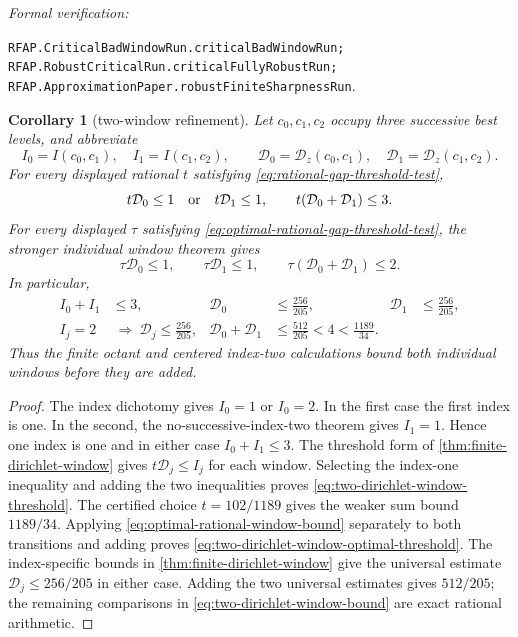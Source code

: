 \documentclass[11pt]{article}
\newtheorem{corollary}[corollary]{Corollary}
\newcommand{\leanref}[1]{\par\smallskip\noindent
  \emph{Formal verification:}\par\nobreak
  {\raggedright\nolinkurl{#1}.\par}}
\begin{document}
\leanref{RFAP.CriticalBadWindowRun.criticalBadWindowRun;
RFAP.RobustCriticalRun.criticalFullyRobustRun;
RFAP.ApproximationPaper.robustFiniteSharpnessRun}

\begin{corollary}[two-window refinement]
\label{cor:two-dirichlet-windows}
Let $c_0,c_1,c_2$ occupy three successive best levels, and abbreviate
\[
 I_0=I(c_0,c_1),\quad I_1=I(c_1,c_2),\qquad
 \mathcal D_0=\mathcal D_z(c_0,c_1),\quad
 \mathcal D_1=\mathcal D_z(c_1,c_2).
\]
For every displayed rational $t$ satisfying
\eqref{eq:rational-gap-threshold-test},
\begin{equation}
\label{eq:two-dirichlet-window-threshold}
 t\mathcal D_0\le1\quad\hbox{or}\quad t\mathcal D_1\le1,
 \qquad
 t(\mathcal D_0+\mathcal D_1)\le3.
\end{equation}
For every displayed $\tau$ satisfying
\eqref{eq:optimal-rational-gap-threshold-test}, the stronger individual
window theorem gives
\begin{equation}
\label{eq:two-dirichlet-window-optimal-threshold}
 \tau\mathcal D_0\le1,\qquad
 \tau\mathcal D_1\le1,\qquad
 \tau(\mathcal D_0+\mathcal D_1)\le2.
\end{equation}
In particular,
\begin{equation}
\label{eq:two-dirichlet-window-bound}
 \begin{aligned}
 I_0+I_1&\le3, &
 \mathcal D_0&\le\frac{256}{205}, &
 \mathcal D_1&\le\frac{256}{205},\\
 I_j=2&\ \Longrightarrow\
   \mathcal D_j\le\frac{256}{205}, &
 \mathcal D_0+\mathcal D_1&\le\frac{512}{205}<4
   <\frac{1189}{34}.
 \end{aligned}
\end{equation}
Thus the finite octant and centered index-two calculations bound both
individual windows before they are added.
\end{corollary}

\begin{proof}
The index dichotomy gives $I_0=1$ or $I_0=2$.  In the first case the first
index is one.  In the second, the no-successive-index-two theorem gives
$I_1=1$.  Hence one index is one and in either case $I_0+I_1\le3$.
The threshold form of \cref{thm:finite-dirichlet-window} gives
$t\mathcal D_j\le I_j$ for each window.  Selecting the index-one inequality
and adding the two inequalities proves
\eqref{eq:two-dirichlet-window-threshold}.  The certified choice
$t=102/1189$ gives the weaker sum bound $1189/34$.
Applying \eqref{eq:optimal-rational-window-bound} separately to both
transitions and adding proves
\eqref{eq:two-dirichlet-window-optimal-threshold}.
The index-specific bounds in \cref{thm:finite-dirichlet-window} give the
universal estimate $\mathcal D_j\le256/205$ in either case.  Adding the two
universal estimates gives $512/205$; the remaining comparisons in
\eqref{eq:two-dirichlet-window-bound} are exact rational arithmetic.
\end{proof}
\end{document}
